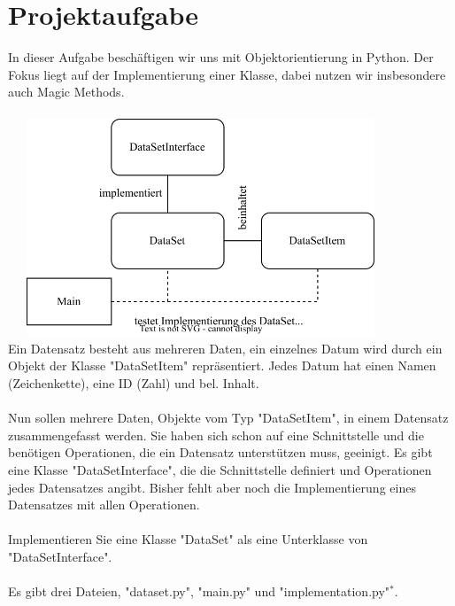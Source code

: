 \documentclass[
oneside,
12pt,
a4paper,
parskip=full
]{scrartcl}
\begin{document}
\section{Projektaufgabe}
 In dieser Aufgabe beschäftigen wir uns mit Objektorientierung in Python. Der Fokus liegt auf der Implementierung einer Klasse, dabei nutzen wir insbesondere auch Magic Methods.\\
\\
\hspace*{2cm}\includegraphics[width=11.5cm, height=6.5cm]{./../diagram/classes_files.png}\\
Ein Datensatz besteht aus mehreren Daten, ein einzelnes Datum wird durch ein Objekt der Klasse "DataSetItem" repräsentiert.
Jedes Datum hat einen Namen (Zeichenkette), eine ID (Zahl) und bel. Inhalt.\\
\\
Nun sollen mehrere Daten, Objekte vom Typ "DataSetItem", in einem Datensatz zusammengefasst werden.
Sie haben sich schon auf eine Schnittstelle und die benötigen Operationen, die ein Datensatz unterstützen muss, geeinigt.
Es gibt eine Klasse "DataSetInterface", die die Schnittstelle definiert und Operationen jedes Datensatzes angibt.
Bisher fehlt aber noch die Implementierung eines Datensatzes mit allen Operationen.\\
\\
Implementieren Sie eine Klasse "DataSet" als eine Unterklasse von "DataSetInterface".\\
\\
Es gibt drei Dateien, "dataset.py", "main.py" und "implementation.py"$^*$.
\end{document}

